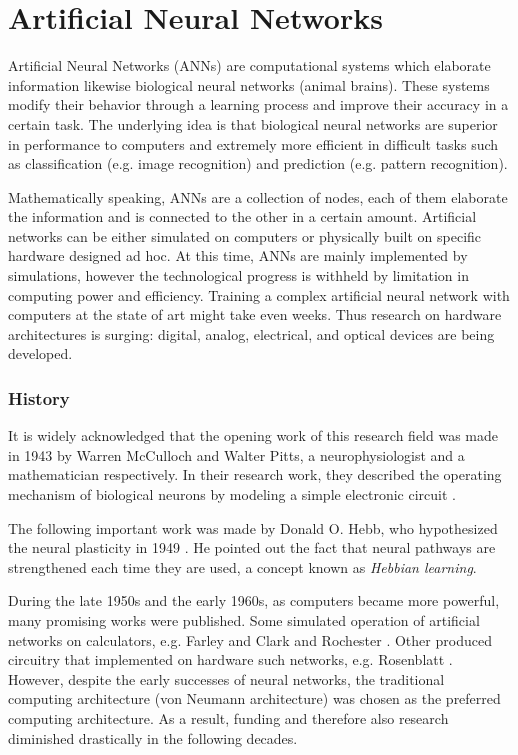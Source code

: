 \chapter{Artificial Neural Networks}
\label{ch:Artificial_Neural_Networks}

Artificial Neural Networks (ANNs) are computational systems which elaborate information likewise biological neural networks (animal brains).
These systems modify their behavior through a learning process and improve their accuracy in a certain task.
The underlying idea is that biological neural networks are superior in performance to computers and extremely more efficient in difficult tasks such as classification (e.g. image recognition) and prediction (e.g. pattern recognition).

Mathematically speaking, ANNs are a collection of nodes, each of them elaborate the information and is connected to the other in a certain amount.
Artificial networks can be either simulated on computers or physically built on specific hardware designed ad hoc.
At this time, ANNs are mainly implemented by simulations, however the technological progress is withheld by limitation in computing power and efficiency.
Training a complex artificial neural network with computers at the state of art might take even weeks.
Thus research on hardware architectures is surging: digital, analog, electrical, and optical devices are being developed.

\subsection{History}
\label{ssec:History}
It is widely acknowledged that the opening work of this research field was made in 1943 by Warren McCulloch and Walter Pitts, a neurophysiologist and a mathematician respectively.
In their research work, they described the operating mechanism of biological neurons by modeling a simple electronic circuit \cite{McCulloch1943}.

The following important work was made by Donald O. Hebb, who hypothesized the neural plasticity in 1949 \cite{hebb1949organization}.
He pointed out the fact that neural pathways are strengthened each time they are used, a concept known as \textit{Hebbian learning}.

During the late 1950s and the early 1960s, as computers became more powerful, many promising works were published.
Some simulated operation of artificial networks on calculators, e.g. Farley and Clark \cite{Farley1954} and Rochester \cite{Rochester1956}.
Other produced circuitry that implemented on hardware such networks, e.g. Rosenblatt \cite{frank1957perceptron,Rosenblatt1958}.
However, despite the early successes of neural networks, the traditional computing architecture (von Neumann architecture) was chosen as the preferred computing architecture.
As a result, funding and therefore also research diminished drastically in the following decades.

